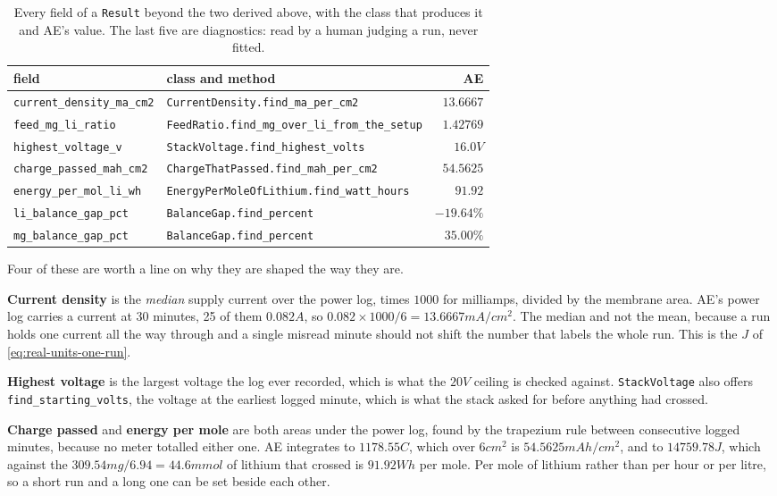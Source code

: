 \begin{table}[htbp]
\centering
\caption{Every field of a \texttt{Result} beyond the two derived above, with the class that
produces it and AE's value. The last five are diagnostics: read by a human judging a run,
never fitted.}
\label{tab:result-fields}
\begin{tabular}{llr}
\toprule
field & class and method & AE \\
\midrule
\texttt{current\_density\_ma\_cm2} & \texttt{CurrentDensity.find\_ma\_per\_cm2} & $13.6667$ \\
\texttt{feed\_mg\_li\_ratio}
  & \texttt{FeedRatio.find\_mg\_over\_li\_from\_the\_setup} & $1.42769$ \\
\addlinespace
\texttt{highest\_voltage\_v} & \texttt{StackVoltage.find\_highest\_volts} & $16.0\unit{V}$ \\
\texttt{charge\_passed\_mah\_cm2} & \texttt{ChargeThatPassed.find\_mah\_per\_cm2} & $54.5625$ \\
\texttt{energy\_per\_mol\_li\_wh} & \texttt{EnergyPerMoleOfLithium.find\_watt\_hours} & $91.92$ \\
\texttt{li\_balance\_gap\_pct} & \texttt{BalanceGap.find\_percent} & $-19.64\%$ \\
\texttt{mg\_balance\_gap\_pct} & \texttt{BalanceGap.find\_percent} & $35.00\%$ \\
\bottomrule
\end{tabular}
\end{table}

Four of these are worth a line on why they are shaped the way they are.

\textbf{Current density} is the \emph{median} supply current over the power log, times $1000$
for milliamps, divided by the membrane area. AE's power log carries a current at 30
minutes, 25 of them $0.082\unit{A}$, so $0.082 \times 1000 / 6 = 13.6667\unit{mA/cm^2}$.
The median and not the
mean, because a run holds one current all the way through and a single misread minute should
not shift the number that labels the whole run. This is the $J$ of
\eqref{eq:real-units-one-run}.

\textbf{Highest voltage} is the largest voltage the log ever recorded, which is what the
$20\unit{V}$ ceiling is checked against. \texttt{StackVoltage} also offers
\texttt{find\_starting\_volts}, the voltage at the earliest logged minute, which is what the
stack asked for before anything had crossed.

\textbf{Charge passed} and \textbf{energy per mole} are both areas under the power log, found
by the trapezium rule between consecutive logged minutes, because no meter totalled either
one. AE integrates to $1178.55\unit{C}$, which over $6\unit{cm^2}$ is
$54.5625\unit{mAh/cm^2}$, and to $14759.78\unit{J}$, which against the
$309.54\unit{mg} / 6.94 = 44.6\unit{mmol}$ of lithium that crossed is
$91.92\unit{Wh}$ per mole. Per mole of lithium rather than per hour or per litre, so a short
run and a long one can be set beside each other.

